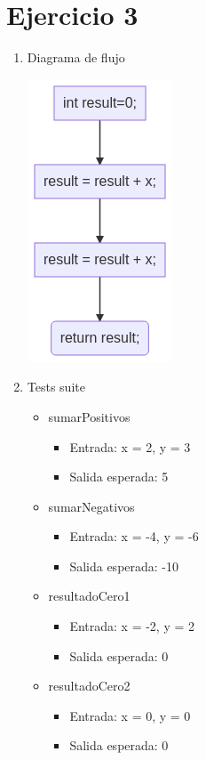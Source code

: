 \documentclass{article}
\begin{document}
\section*{Ejercicio 3}

\begin{enumerate}
    \item Diagrama de flujo

    \quad\includegraphics[scale=0.65]{recursos/suma.png}

    \item Tests suite
    
    \begin{itemize}
        \item sumarPositivos
            \begin{itemize}
                \item Entrada: x = 2, y = 3
                \item Salida esperada: 5
            \end{itemize}
        \item sumarNegativos
            \begin{itemize}
                \item Entrada: x = -4, y = -6
                \item Salida esperada: -10
            \end{itemize}
        \item resultadoCero1
            \begin{itemize}
                \item Entrada: x = -2, y = 2
                \item Salida esperada: 0
            \end{itemize}
        \item resultadoCero2
            \begin{itemize}
                \item Entrada: x = 0, y = 0
                \item Salida esperada: 0
            \end{itemize}
    \end{itemize}
\end{enumerate}
\end{document}
